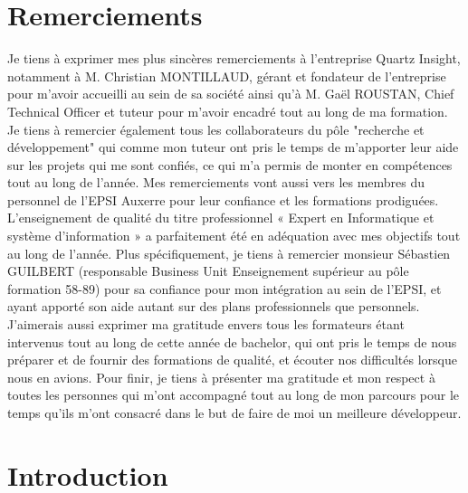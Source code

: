 \documentclass[a4paper, 11pt]{report}
\begin{document}
\chapter{Remerciements}
Je tiens à exprimer mes plus sincères remerciements à l’entreprise Quartz Insight, notamment à M. Christian MONTILLAUD, gérant et fondateur de l’entreprise pour m'avoir accueilli au sein de sa société ainsi qu'à M. Gaël ROUSTAN, Chief Technical Officer et tuteur pour m'avoir encadré tout au long de ma formation.
Je tiens à remercier également tous les collaborateurs du pôle "recherche et développement" qui comme mon tuteur ont pris le temps de m’apporter leur aide sur les projets qui me sont confiés, ce qui m’a permis de monter en compétences tout au long de l’année.
\newline
\newline
Mes remerciements vont aussi vers les membres du personnel de l’EPSI Auxerre pour leur confiance et les formations prodiguées.
L’enseignement de qualité du titre professionnel « Expert en Informatique et système  d’information »  a parfaitement été en adéquation avec mes objectifs tout au long de l’année. 
Plus spécifiquement, je tiens à remercier monsieur Sébastien GUILBERT (responsable Business Unit Enseignement supérieur au pôle formation 58-89) pour sa confiance pour mon intégration au sein de l’EPSI, et ayant apporté son aide autant sur des plans professionnels que personnels.
\newline
\newline
J’aimerais aussi exprimer ma gratitude envers tous les formateurs étant intervenus tout au long de cette année de bachelor, qui ont pris le temps de nous préparer et de fournir des formations de qualité, et écouter nos difficultés lorsque nous en avions.
\newline
\newline
Pour finir, je tiens à présenter ma gratitude et mon respect à toutes les personnes qui m'ont accompagné tout au long de mon parcours pour le temps qu'ils m'ont consacré dans le but de faire de moi un meilleure développeur.

\chapter{Introduction}
\end{document}
